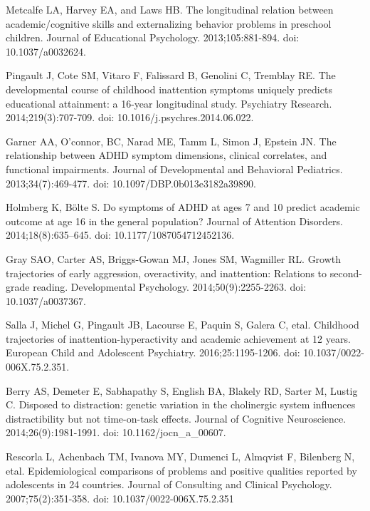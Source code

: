 \documentclass[10pt,letterpaper]{article}
\begin{document}
{\begin{thebibliography}{vancouver.bst}
Metcalfe LA, Harvey EA, and Laws HB.
\newblock The longitudinal relation between academic/cognitive skills and
  externalizing behavior problems in preschool children.
\newblock Journal of Educational Psychology. 2013;105:881-894. doi: 10.1037/a0032624.


Pingault J, Cote SM, Vitaro F, Falissard B, Genolini C, Tremblay RE.
\newblock The developmental course of childhood inattention symptoms uniquely
  predicts educational attainment: a 16-year longitudinal study.
\newblock Psychiatry Research. 2014;219(3):707-709. doi: 10.1016/j.psychres.2014.06.022.


Garner AA, O'connor, BC, Narad ME, Tamm L, Simon J, Epstein JN.
\newblock The relationship between {ADHD} symptom dimensions, clinical
  correlates, and functional impairments.
\newblock Journal of Developmental and Behavioral Pediatrics. 2013;34(7):469-477. doi: 10.1097/DBP.0b013e3182a39890.

Holmberg K, {B\"{o}lte} S.
\newblock Do symptoms of {ADHD} at ages 7 and 10 predict academic outcome at age 16 in the general population?
\newblock Journal of Attention Disorders. 2014;18(8):635--645. doi: 10.1177/1087054712452136.


Gray SAO, Carter AS, Briggs-Gowan MJ, Jones SM, Wagmiller RL.
\newblock Growth trajectories of early aggression, overactivity, and inattention: Relations to second-grade reading.
\newblock Developmental Psychology. 2014;50(9):2255-2263. doi: 10.1037/a0037367. 


Salla J, Michel G, Pingault JB, Lacourse E, 
  Paquin S, Galera C, etal. 
\newblock Childhood trajectories of inattention-hyperactivity and academic
  achievement at 12 years.
\newblock European Child and Adolescent Psychiatry. 2016;25:1195-1206. doi: 10.1037/0022-006X.75.2.351.

Berry AS, Demeter E, Sabhapathy S, English BA,
  Blakely RD, Sarter M, Lustig C.
\newblock Disposed to distraction: genetic variation in the cholinergic system
  influences distractibility but not time-on-task effects.
\newblock Journal of Cognitive Neuroscience. 2014;26(9):1981-1991.  doi: 10.1162/jocn\_a\_00607.


Rescorla L, Achenbach TM, Ivanova MY, Dumenci L, 
  Almqvist F, Bilenberg N, etal. 
\newblock Epidemiological comparisons of problems and positive qualities
  reported by adolescents in 24 countries.
\newblock Journal of Consulting and Clinical Psychology. 2007;75(2):351-358. doi: 10.1037/0022-006X.75.2.351




\end{thebibliography}}
\end{document}

